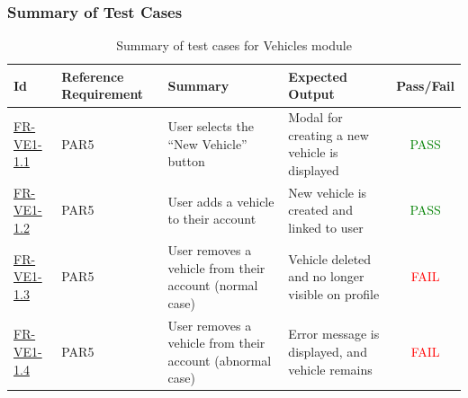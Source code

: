 \documentclass[12pt, titlepage]{article}
\newcommand{\testpass}{\textcolor{green}{PASS}}
\newcommand{\testfail}{\textcolor{red}{FAIL}}
\begin{document}
        \subsubsection{Summary of Test Cases}
            \begin{table}[H]
                \centering
                \begin{tabularx}{\textwidth}{|l|p{2.3cm}|X|X|c|}
                    \hline
                    Id & Reference Requirement & Summary & Expected Output & Pass/Fail \\ \hline
                    \hyperref[FR-VE1-1.1]{FR-VE1-1.1} & PAR5 & User selects the ``New Vehicle'' button & Modal for creating a new vehicle is displayed & \testpass \\ \hline
                    \hyperref[FR-VE1-1.2]{FR-VE1-1.2} & PAR5 & User adds a vehicle to their account & New vehicle is created and linked to user & \testpass \\ \hline
                    \hyperref[FR-VE1-1.3]{FR-VE1-1.3} & PAR5 & User removes a vehicle from their account (normal case) & Vehicle deleted and no longer visible on profile & \testfail \\ \hline
                    \hyperref[FR-VE1-1.4]{FR-VE1-1.4} & PAR5 & User removes a vehicle from their account (abnormal case) & Error message is displayed, and vehicle remains & \testfail \\ \hline
                \end{tabularx}
                \caption{Summary of test cases for Vehicles module}
            \end{table}
\end{document}
